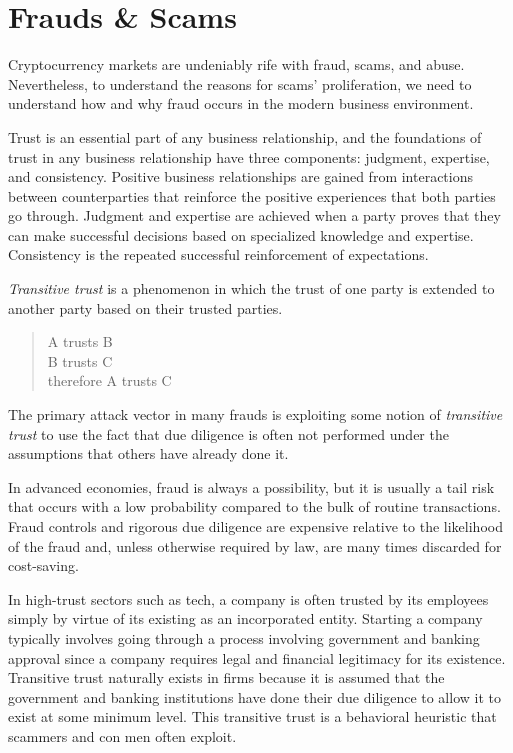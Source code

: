 \chapter{Frauds \& Scams}

Cryptocurrency markets are undeniably rife with fraud, scams, and abuse.
Nevertheless, to understand the reasons for scams' proliferation, we need to
understand how and why fraud occurs in the modern business environment.

Trust is an essential part of any business relationship, and the foundations of
trust in any business relationship have three components: judgment, expertise,
and consistency. Positive business relationships are gained from interactions
between counterparties that reinforce the positive experiences that both parties
go through. Judgment and expertise are achieved when a party proves that they
can make successful decisions based on specialized knowledge and expertise.
Consistency is the repeated successful reinforcement of expectations.

\textit{Transitive trust} is a phenomenon in which the trust of one party is
extended to another party based on their trusted parties.

\begin{quote}
A trusts B \\
B trusts C \\
therefore A trusts C\\
\end{quote}

The primary attack vector in many frauds is exploiting some notion of
\textit{transitive trust} to use the fact that due diligence is often not
performed under the assumptions that others have already done it.


In advanced economies, fraud is always a possibility, but it is usually a tail
risk that occurs with a low probability compared to the bulk of routine
transactions. Fraud controls and rigorous due diligence are expensive relative
to the likelihood of the fraud and, unless otherwise required by law, are many
times discarded for cost-saving.

In high-trust sectors such as tech, a company is often trusted by its employees
simply by virtue of its existing as an incorporated entity. Starting a company
typically involves going through a process involving government and banking
approval since a company requires legal and financial legitimacy for its
existence. Transitive trust naturally exists in firms because it is assumed that
the government and banking institutions have done their due diligence to allow
it to exist at some minimum level. This transitive trust is a behavioral
heuristic that scammers and con men often exploit.

